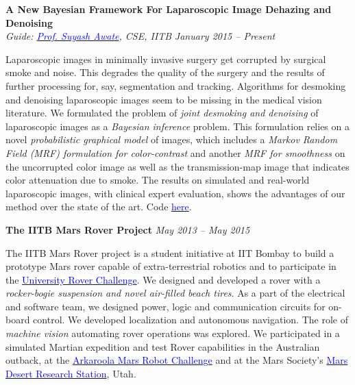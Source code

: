 \documentclass[margin,line]{res}
\newenvironment{list1}{
  \begin{list}{\ding{113}}{%
      \setlength{\itemsep}{0in}
      \setlength{\parsep}{0in} \setlength{\parskip}{0in}
      \setlength{\topsep}{0in} \setlength{\partopsep}{0in} 
      \setlength{\leftmargin}{0.17in}}}{\end{list}}
\begin{document}
\begin{resume}
{\bf A New Bayesian Framework For Laparoscopic Image Dehazing and Denoising} \\
{\em Guide: \href{https://www.cse.iitb.ac.in/~suyash}{\textcolor{blue}{Prof. Suyash Awate}}, CSE, IITB} \hfill {\it January 2015 -- Present} \\
\vspace*{-.13in}
\begin{list1}
\item[]
Laparoscopic images in minimally invasive surgery get corrupted by surgical smoke and noise. This degrades the quality of the surgery and the results of further processing for, say, segmentation and tracking. Algorithms for desmoking and denoising laparoscopic images seem to be missing in the medical vision literature. We formulated the problem of \textit{joint desmoking and denoising} of laparoscopic images as a \textit{Bayesian inference} problem. This formulation relies on a novel \textit{probabilistic graphical model} of images, which includes a \textit{Markov Random Field (MRF) formulation for color-contrast} and another \textit{MRF for smoothness} on the uncorrupted color image as well as the transmission-map image that indicates color attenuation due to smoke. The results on simulated and real-world laparoscopic images, with clinical expert evaluation, shows the advantages of our method over the state of the art. Code \href{https://github.com/alankarkotwal/lap-dehazing}{\textcolor{blue} {here}}.
\end{list1}

{\bf The IITB Mars Rover Project}
\hfill {\it May 2013 -- May 2015} \\
\vspace*{-.13in}
\begin{list1}
\item[]
The IITB Mars Rover project is a student initiative at IIT Bombay to build a prototype Mars rover capable of extra-terrestrial robotics and to participate in the \href{http://urc.marssociety.org/}{\textcolor{blue} {University Rover Challenge}}. We designed and developed a rover with a \textit{rocker-bogie suspension and novel air-filled beach tires}. As a part of the electrical and software team, we designed power, logic and communication circuits for on-board control. We developed localization and autonomous navigation. The role of \textit{machine vision} automating rover operations was explored. We participated in a simulated Martian expedition and test Rover capabilities in the Australian outback, at the \href{http://marssociety.org.au/article/arkaroola-mars-robot-challenge-spaceward-bound-expedition}{\textcolor{blue} {Arkaroola Mars Robot Challenge}} and at the Mars Society's \href{http://mdrs.marssociety.org/}{\textcolor{blue} {Mars Desert Research Station}}, Utah.
\end{list1}


\end{resume}
\end{document}

